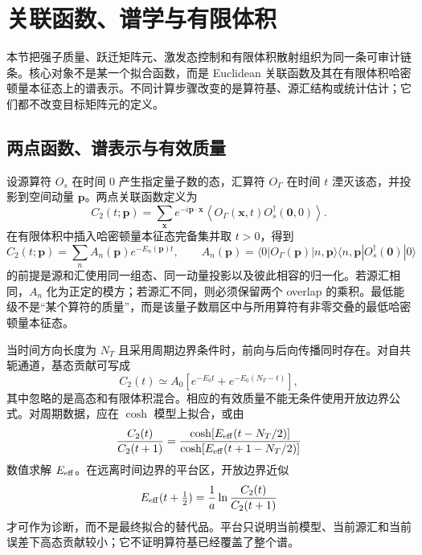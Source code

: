 \chapter{关联函数、谱学与有限体积}\label{sec:b02-correlators}

本节把强子质量、跃迁矩阵元、激发态控制和有限体积散射组织为同一条可审计链条。核心对象不是某一个拟合函数，而是 Euclidean 关联函数及其在有限体积哈密顿量本征态上的谱表示。不同计算步骤改变的是算符基、源汇结构或统计估计；它们都不改变目标矩阵元的定义。

\section{两点函数、谱表示与有效质量}\label{subsec:b02-two-point}

设源算符 \(O_s\) 在时间 \(0\) 产生指定量子数的态，汇算符 \(O_\Gamma\) 在时间 \(t\) 湮灭该态，并投影到空间动量 \(\mathbf p\)。两点关联函数定义为
\begin{equation}
  C_2(t;\mathbf p)
  =\sum_{\mathbf x}e^{-i\mathbf p\cdot\mathbf x}
  \left\langle O_\Gamma(\mathbf x,t)O_s^\dagger(\mathbf 0,0)\right\rangle .
  \label{eq:b02-two-point}
\end{equation}
在有限体积中插入哈密顿量本征态完备集并取 \(t>0\)，得到
\begin{equation}
  C_2(t;\mathbf p)
  =\sum_n A_n(\mathbf p)e^{-E_n(\mathbf p)t},
  \qquad
  A_n(\mathbf p)
  =\langle 0|O_\Gamma(\mathbf p)|n,\mathbf p\rangle
  \langle n,\mathbf p|O_s^\dagger(\mathbf 0)|0\rangle
  \label{eq:b02-two-point-spectral}
\end{equation}
的前提是源和汇使用同一组态、同一动量投影以及彼此相容的归一化。若源汇相同，\(A_n\) 化为正定的模方；若源汇不同，则必须保留两个 overlap 的乘积。最低能级不是“某个算符的质量”，而是该量子数扇区中与所用算符有非零交叠的最低哈密顿量本征态。

当时间方向长度为 \(N_T\) 且采用周期边界条件时，前向与后向传播同时存在。对自共轭通道，基态贡献可写成
\begin{equation}
  C_2(t)\simeq A_0\left[
  e^{-E_0t}+e^{-E_0(N_T-t)}
  \right],
  \label{eq:b02-cosh}
\end{equation}
其中忽略的是高态和有限体积混合。相应的有效质量不能无条件使用开放边界公式。对周期数据，应在 \(\cosh\) 模型上拟合，或由
\begin{equation}
  \frac{C_2(t)}{C_2(t+1)}
  =
  \frac{\cosh\!\left[E_{\rm eff}(t-N_T/2)\right]}
       {\cosh\!\left[E_{\rm eff}(t+1-N_T/2)\right]}
  \label{eq:b02-periodic-meff}
\end{equation}
数值求解 \(E_{\rm eff}\)。在远离时间边界的平台区，开放边界近似
\begin{equation}
  E_{\rm eff}(t+\tfrac12)
  =\frac1a\ln\frac{C_2(t)}{C_2(t+1)}
  \label{eq:b02-meff}
\end{equation}
才可作为诊断，而不是最终拟合的替代品。平台只说明当前模型、当前源汇和当前误差下高态贡献较小；它不证明算符基已经覆盖了整个谱。

